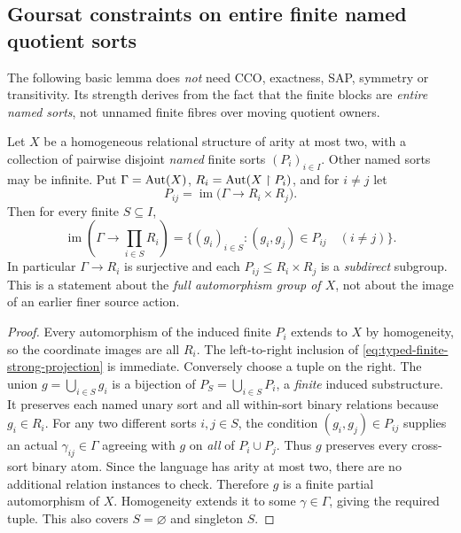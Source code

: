 \subsection{Goursat constraints on entire finite named quotient sorts}

The following basic lemma does \emph{not} need CCO, exactness,
SAP, symmetry or transitivity. Its strength derives from the
fact that the finite blocks are \emph{entire named sorts},
not unnamed finite fibres over moving quotient owners.

\begin{lemma}
\label{lem:typed-finite-entire-axis-projection}
Let $X$ be a homogeneous relational structure of arity at most
two, with a collection of pairwise disjoint \emph{named} finite
sorts $(P_i)_{i\in I}$. Other named sorts may be infinite.
Put $\Gamma=\operatorname{Aut}(X)$,
$R_i=\operatorname{Aut}(X\restriction P_i)$, and for $i\ne j$ let
\[
 P_{ij}=\operatorname{im}\bigl(
   \Gamma\longrightarrow R_i\times R_j\bigr).
\]
Then for every finite $S\subseteq I$,
\[
 \boxed{\quad
 \operatorname{im}\!\left(
 \Gamma\longrightarrow\prod_{i\in S}R_i\right)
 =\bigl\{(g_i)_{i\in S}:
               (g_i,g_j)\in P_{ij}\quad(i\ne j)\bigr\}.
 \quad}\tag{TQ3}\label{eq:typed-finite-strong-projection}
\]
In particular $\Gamma\to R_i$ is surjective and each
$P_{ij}\le R_i\times R_j$ is a \emph{subdirect} subgroup.
This is a statement about the \emph{full automorphism group of
$X$}, not about the image of an earlier finer source action.
\end{lemma}
\begin{proof}
Every automorphism of the induced finite $P_i$ extends to
$X$ by homogeneity, so the coordinate images are all $R_i$.
The left-to-right inclusion of \eqref{eq:typed-finite-strong-projection}
is immediate. Conversely choose a tuple on the right.
The union $g=\bigcup_{i\in S}g_i$ is a bijection of
$P_S=\bigcup_{i\in S}P_i$, a \emph{finite} induced
substructure. It preserves each named unary sort and all
within-sort binary relations because $g_i\in R_i$.
For any two different sorts $i,j\in S$, the
condition $(g_i,g_j)\in P_{ij}$ supplies an actual
$\gamma_{ij}\in\Gamma$ agreeing with $g$ on \emph{all}
of $P_i\cup P_j$. Thus $g$ preserves every cross-sort
binary atom. Since the language has arity at most two,
there are no additional relation instances to check.
Therefore $g$ is a finite partial automorphism of $X$.
Homogeneity extends it to some $\gamma\in\Gamma$,
giving the required tuple. This also covers $S=\varnothing$
and singleton $S$.
\end{proof}

